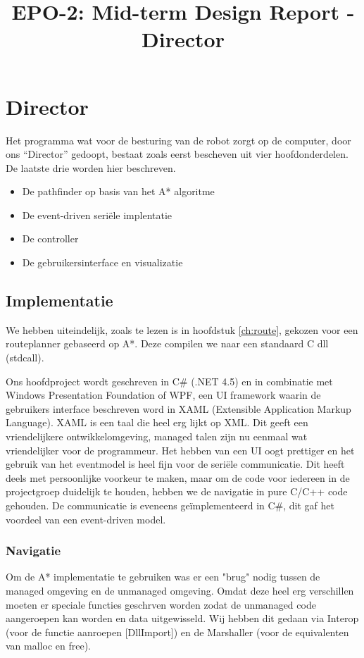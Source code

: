 \documentclass{report}
\title{EPO-2: Mid-term Design Report - Director}
\author{}
\begin{document}
\chapter{Director}
\label{ch:director}
Het programma wat voor de besturing van de robot zorgt op de computer, door ons ``Director'' gedoopt, bestaat zoals eerst bescheven uit vier hoofdonderdelen. De laatste drie worden hier beschreven.
\begin{itemize}
\item De pathfinder op basis van het A* algoritme
\item De event-driven seriële implentatie
\item De controller
\item De gebruikersinterface en visualizatie
\end{itemize}
\section{Implementatie}
\label{sec:dirImplementatie}
We hebben uiteindelijk, zoals te lezen is in hoofdstuk \ref{ch:route}, gekozen voor een routeplanner gebaseerd op A*. Deze compilen we naar een standaard C dll (stdcall).

Ons hoofdproject wordt geschreven in C\# (.NET 4.5) en in combinatie met Windows Presentation Foundation of WPF, een UI framework waarin de gebruikers interface beschreven word in XAML (Extensible Application Markup Language).
XAML is een taal die heel erg lijkt op XML.
Dit geeft een vriendelijkere ontwikkelomgeving, managed talen zijn nu eenmaal wat vriendelijker voor de programmeur.
Het hebben van een UI oogt prettiger en het gebruik van het eventmodel is heel fijn voor de seriële communicatie.
Dit heeft deels met persoonlijke voorkeur te maken, maar om de code voor iedereen in de projectgroep duidelijk te houden, hebben we de navigatie in pure C/C++ code gehouden.
De communicatie is eveneens geïmplementeerd in C\#, dit gaf het voordeel van een event-driven model.

\subsection{Navigatie}
Om de A* implementatie te gebruiken was er een "brug" nodig tussen de managed omgeving en de unmanaged omgeving.
Omdat deze heel erg verschillen moeten er speciale functies geschrven worden zodat de unmanaged code aangeroepen kan worden en data uitgewisseld.
Wij hebben dit gedaan via Interop (voor de functie aanroepen [DllImport]) en de Marshaller (voor de equivalenten van malloc en free).
\end{document}

